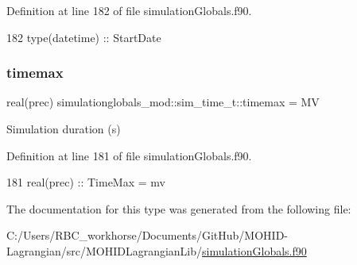 Definition at line 182 of file simulation\+Globals.\+f90.


\begin{DoxyCode}
182         \textcolor{keywordtype}{type}(datetime)  :: StartDate
\end{DoxyCode}
\mbox{\label{structsimulationglobals__mod_1_1sim__time__t_ae84053cfbfb0b731cbf15e7334f223cd}} 
\subsubsection{\texorpdfstring{timemax}{timemax}}
{\footnotesize\ttfamily real(prec) simulationglobals\+\_\+mod\+::sim\+\_\+time\+\_\+t\+::timemax = MV\hspace{0.3cm}{\ttfamily [private]}}



Simulation duration (s) 



Definition at line 181 of file simulation\+Globals.\+f90.


\begin{DoxyCode}
181         \textcolor{keywordtype}{real(prec)}      :: TimeMax = mv              
\end{DoxyCode}


The documentation for this type was generated from the following file\+:\begin{DoxyCompactItemize}
\item 
C\+:/\+Users/\+R\+B\+C\+\_\+workhorse/\+Documents/\+Git\+Hub/\+M\+O\+H\+I\+D-\/\+Lagrangian/src/\+M\+O\+H\+I\+D\+Lagrangian\+Lib/\mbox{\hyperlink{simulation_globals_8f90}{simulation\+Globals.\+f90}}\end{DoxyCompactItemize}

